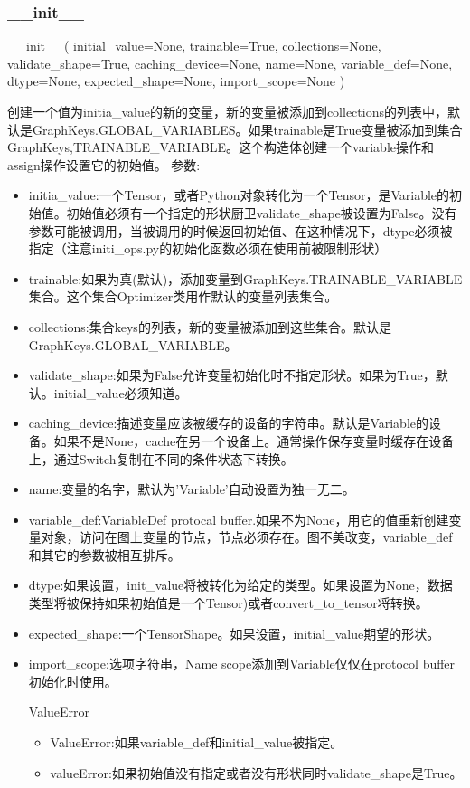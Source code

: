 \subsubsection{\_\_init\_\_}
\begin{python}
__init__(
    initial_value=None,
    trainable=True,
    collections=None,
    validate_shape=True,
    caching_device=None,
    name=None,
    variable_def=None,
    dtype=None,
    expected_shape=None,
    import_scope=None
)
\end{python}
创建一个值为initia\_value的新的变量，新的变量被添加到collections的列表中，默认是GraphKeys.GLOBAL\_VARIABLES。如果trainable是True变量被添加到集合GraphKeys,TRAINABLE\_VARIABLE。这个构造体创建一个variable操作和assign操作设置它的初始值。
参数:
\begin{itemize}
\item initia\_value:一个Tensor，或者Python对象转化为一个Tensor，是Variable的初始值。初始值必须有一个指定的形状厨卫validate\_shape被设置为False。没有参数可能被调用，当被调用的时候返回初始值、在这种情况下，dtype必须被指定（注意initi\_ops.py的初始化函数必须在使用前被限制形状）
\item trainable:如果为真(默认)，添加变量到GraphKeys.TRAINABLE\_VARIABLE集合。这个集合Optimizer类用作默认的变量列表集合。
\item collections:集合keys的列表，新的变量被添加到这些集合。默认是GraphKeys.GLOBAL\_VARIABLE。
\item validate\_shape:如果为False允许变量初始化时不指定形状。如果为True，默认。initial\_value必须知道。
\item caching\_device:描述变量应该被缓存的设备的字符串。默认是Variable的设备。如果不是None，cache在另一个设备上。通常操作保存变量时缓存在设备上，通过Switch复制在不同的条件状态下转换。
\item name:变量的名字，默认为'Variable'自动设置为独一无二。
\item variable\_def:VariableDef protocal buffer.如果不为None，用它的值重新创建变量对象，访问在图上变量的节点，节点必须存在。图不美改变，variable\_def和其它的参数被相互排斥。
\item dtype:如果设置，init\_value将被转化为给定的类型。如果设置为None，数据类型将被保持如果初始值是一个Tensor)或者convert\_to\_tensor将转换。
\item expected\_shape:一个TensorShape。如果设置，initial\_value期望的形状。
\item import\_scope:选项字符串，Name scope添加到Variable仅仅在protocol buffer初始化时使用。
\item[ValueError]
\begin{itemize}
	\item ValueError:如果variable\_def和initial\_value被指定。
	\item valueError:如果初始值没有指定或者没有形状同时validate\_shape是True。
\end{itemize}
\end{itemize}
